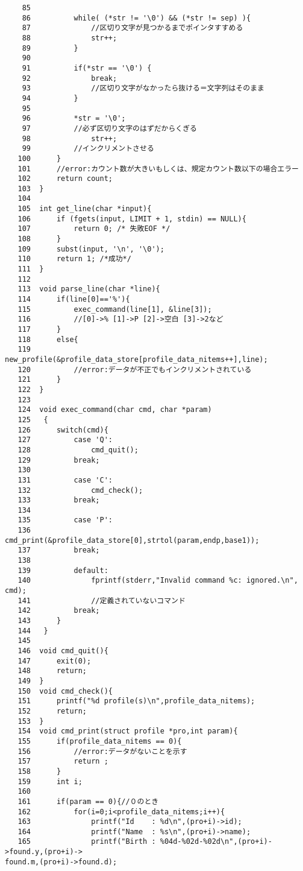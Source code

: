 \documentclass[a4j,11pt]{jarticle}
\begin{document}
{\begin{verbatim}
    85
    86          while( (*str != '\0') && (*str != sep) ){
    87              //区切り文字が見つかるまでポインタすすめる
    88              str++;
    89          }
    90
    91          if(*str == '\0') {
    92              break;
    93              //区切り文字がなかったら抜ける＝文字列はそのまま
    94          }                                                               
    95
    96          *str = '\0';
    97          //必ず区切り文字のはずだからくぎる
    98              str++;
    99          //インクリメントさせる
   100      }
   101      //error:カウント数が大きいもしくは、規定カウント数以下の場合エラー
   102      return count;
   103  }
   104
   105  int get_line(char *input){
   106      if (fgets(input, LIMIT + 1, stdin) == NULL){
   107          return 0; /* 失敗EOF */
   108      }
   109      subst(input, '\n', '\0');
   110      return 1; /*成功*/
   111  }
   112
   113  void parse_line(char *line){
   114      if(line[0]=='%'){
   115          exec_command(line[1], &line[3]);
   116          //[0]->% [1]->P [2]->空白 [3]->2など
   117      }
   118      else{
   119          new_profile(&profile_data_store[profile_data_nitems++],line);
   120          //error:データが不正でもインクリメントされている
   121      }
   122  }
   123
   124  void exec_command(char cmd, char *param)
   125   {
   126      switch(cmd){
   127          case 'Q':
   128              cmd_quit();
   129          break;
   130
   131          case 'C':
   132              cmd_check();
   133          break;
   134
   135          case 'P':
   136              cmd_print(&profile_data_store[0],strtol(param,endp,base1));
   137          break;
   138
   139          default:
   140              fprintf(stderr,"Invalid command %c: ignored.\n", cmd);
   141              //定義されていないコマンド
   142          break;
   143      }
   144   }
   145
   146  void cmd_quit(){
   147      exit(0);
   148      return;
   149  }
   150  void cmd_check(){
   151      printf("%d profile(s)\n",profile_data_nitems);
   152      return;
   153  }
   154  void cmd_print(struct profile *pro,int param){
   155      if(profile_data_nitems == 0){
   156          //error:データがないことを示す
   157          return ;
   158      }
   159      int i;
   160
   161      if(param == 0){//０のとき
   162          for(i=0;i<profile_data_nitems;i++){
   163              printf("Id    : %d\n",(pro+i)->id);
   164              printf("Name  : %s\n",(pro+i)->name);
   165              printf("Birth : %04d-%02d-%02d\n",(pro+i)->found.y,(pro+i)->
found.m,(pro+i)->found.d);

\end{verbatim}}
\end{document}
